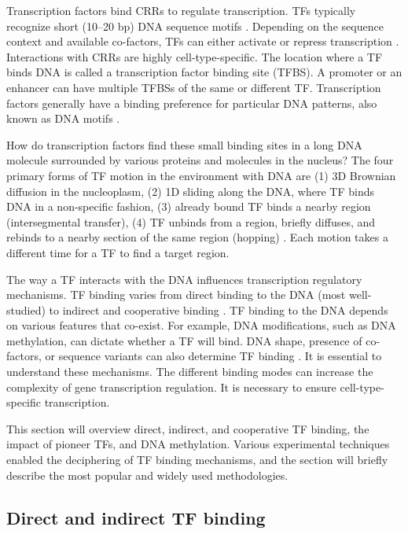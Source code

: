   Transcription factors bind CRRs to regulate transcription. TFs typically recognize short (10--20 bp) DNA sequence motifs \cite{ambrosini2020insights}. Depending on the sequence context and available co-factors, TFs can either activate or repress transcription \cite{lambert2018human}. Interactions with CRRs are highly cell-type-specific. The location where a TF binds DNA is called a transcription factor binding site (TFBS). A promoter or an enhancer can have multiple TFBSs of the same or different TF. Transcription factors generally have a binding preference for particular DNA patterns, also known as DNA motifs \cite{boeva2016analysis}.

  How do transcription factors find these small binding sites in a long DNA molecule surrounded by various proteins and molecules in the nucleus? The four primary forms of TF motion in the environment with DNA are (1) 3D Brownian diffusion in the nucleoplasm, (2) 1D sliding along the DNA, where TF binds DNA in a non-specific fashion, (3) already bound TF binds a nearby region (intersegmental transfer), (4) TF unbinds from a region, briefly diffuses, and rebinds to a nearby section of the same region (hopping) \cite{schmidt2014integrated}. Each motion takes a different time for a TF to find a target region.

  The way a TF interacts with the DNA influences transcription regulatory mechanisms. TF binding varies from direct binding to the DNA (most well-studied) to indirect and cooperative binding \cite{boeva2016analysis,inukai2017transcription}. TF binding to the DNA depends on various features that co-exist. For example, DNA modifications, such as DNA methylation, can dictate whether a TF will bind. DNA shape, presence of co-factors, or sequence variants can also determine TF binding \cite{inukai2017transcription}. It is essential to understand these mechanisms. The different binding modes can increase the complexity of gene transcription regulation. It is necessary to ensure cell-type-specific transcription.

  This section will overview direct, indirect, and cooperative TF binding, the impact of pioneer TFs, and DNA methylation. Various experimental techniques enabled the deciphering of TF binding mechanisms, and the section will briefly describe the most popular and widely used methodologies.

    \subsection{Direct and indirect TF binding}

